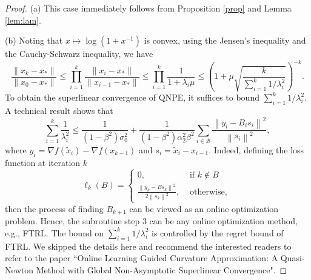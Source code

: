 \documentclass[11pt]{article}
\newcommand{\tx}{\tilde x}
\begin{document}
\begin{proof}
	(a) This case immediately follows from Proposition \ref{prop} and Lemma \ref{lem:lam}.
	
	(b) Noting that $x\mapsto \log(1+x^{-1})$ is convex, using the Jensen's inequality and the Cauchy-Schwarz inequality, we have
	\[
	\frac{\|x_k-x_*\|}{\|x_0 - x_*\|} \le \prod_{i=1}^k \frac{\|x_i-x_*\|}{\|x_{i-1} - x_*\|} \le \prod_{i=1}^k  \frac{1}{1+\lambda_i \mu} \le \left(1+\mu \sqrt{\frac{k}{\sum_{i=1}^k 1/\lambda_i^2}}\right)^{-k}.
	\]
	To obtain the superlinear convergence of QNPE, it suffices to bound $\sum_{i=1}^k 1/\lambda_i^2$.
	A technical result shows that
	\[
	\sum_{i=1}^k \frac{1}{\lambda_i^2} \leq \frac{1}{\left(1-\beta^2\right) \sigma_0^2}+\frac{1}{\left(1-\beta^2\right) \alpha_2^2 \beta^2} \sum_{i \in \mathcal{B}} \frac{\left\|y_i-B_i s_i\right\|^2}{\left\|s_i\right\|^2},
	\]
	where $y_i = \nabla f(\tx_i) - \nabla f(x_{k-1})$ and $s_i = \tx_i - x_{i-1}$.
	Indeed, defining the loss function at iteration $k$
	\[
	\ell_k(B) = \begin{cases}0, & \text { if } k \notin B \\ \frac{\left\|y_k-B s_k\right\|^2}{2\left\|s_k\right\|^2}, & \text { otherwise, }\end{cases}
	\]
	then the process of finding $B_{k+1}$ can be viewed as an online optimization problem. Hence, the subroutine step 3 can be any online optimization method, e.g., FTRL.
	The bound on $\sum_{i=1}^k 1/\lambda_i^2$ is controlled by the regret bound of FTRL. We skipped the details here and recommend the interested readers to refer to the paper ``Online Learning Guided Curvature Approximation: A Quasi-Newton Method with Global Non-Asymptotic Superlinear Convergence".
\end{proof}
\end{document}
